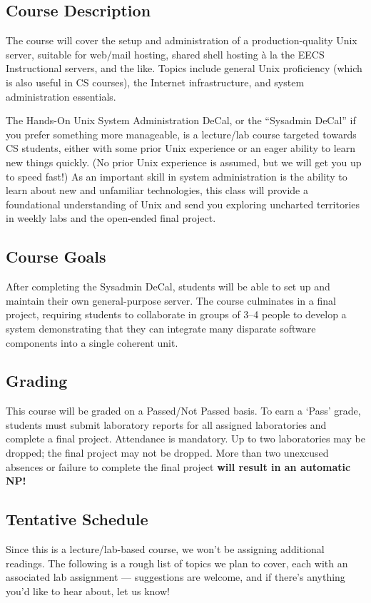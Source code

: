 \documentclass{article}
\begin{document}
\begin{multicols}{2}

\subsection*{Course Description}
The course will cover the setup and administration of a production-quality Unix server, suitable for web/mail hosting, shared shell hosting à la the EECS Instructional servers, and the like.  Topics include general Unix proficiency (which is also useful in CS courses), the Internet infrastructure, and system administration essentials.

The Hands-On {\sc Unix} System Administration DeCal, or the ``Sysadmin DeCal'' if you prefer something more manageable, is a lecture/lab course targeted towards CS students, either with some prior Unix experience or an eager ability to learn new things quickly.  (No prior Unix experience is assumed, but we will get you up to speed fast!)  As an important skill in system administration is the ability to learn about new and unfamiliar technologies, this class will provide a foundational understanding of Unix and send you exploring uncharted territories in weekly labs and the open-ended final project.

\subsection*{Course Goals}
After completing the Sysadmin DeCal, students will be able to set up and maintain their own general-purpose server.  The course culminates in a final project, requiring students to collaborate in groups of 3--4 people to develop a system demonstrating that they can integrate many disparate software components into a single coherent unit.

\subsection*{Grading}
This course will be graded on a Passed/Not Passed basis.  To earn a `Pass' grade, students must submit laboratory reports for all assigned laboratories and complete a final project.  Attendance is mandatory.  Up to two laboratories may be dropped; the final project may not be dropped.  More than two unexcused absences or failure to complete the final project \textbf{will result in an automatic NP!}

\subsection*{Tentative Schedule}
Since this is a lecture/lab-based course, we won't be assigning additional readings.  The following is a rough list of topics we plan to cover, each with an associated lab assignment --- suggestions are welcome, and if there's anything you'd like to hear about, let us know!


\end{multicols}
\end{document}
